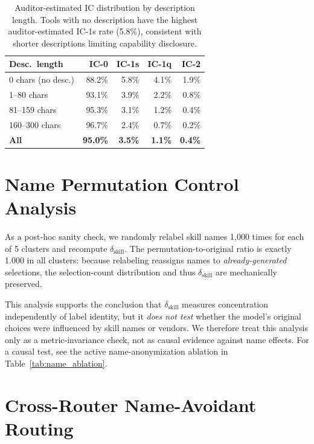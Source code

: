 \documentclass[11pt]{article}
\begin{document}
\begin{table}[t]
\centering\small
\begin{tabular}{lrrrr}
\toprule
\textbf{Desc.\ length} & \textbf{IC-0} & \textbf{IC-1s} & \textbf{IC-1q} & \textbf{IC-2} \\
\midrule
0 chars (no desc.)  & 88.2\% & 5.8\% & 4.1\% & 1.9\% \\
1--80 chars          & 93.1\% & 3.9\% & 2.2\% & 0.8\% \\
81--159 chars         & 95.3\% & 3.1\% & 1.2\% & 0.4\% \\
160--300 chars        & 96.7\% & 2.4\% & 0.7\% & 0.2\% \\
\midrule
\textbf{All}         & \textbf{95.0\%} & \textbf{3.5\%} & \textbf{1.1\%} & \textbf{0.4\%} \\
\bottomrule
\end{tabular}
\caption{Auditor-estimated IC distribution by description length.
Tools with no description have the highest auditor-estimated IC-1s
rate (5.8\%), consistent with shorter descriptions limiting
capability disclosure.}
\label{tab:ic_detailed}
\end{table}

\section{Name Permutation Control Analysis}
\label{app:namecontrol}

As a post-hoc sanity check, we randomly relabel skill names
1{,}000 times for each of 5 clusters and recompute
$\delta_\text{skill}$.
The permutation-to-original ratio is exactly 1.000 in all
clusters: because relabeling reassigns names to
\emph{already-generated} selections, the selection-count
distribution and thus $\delta_\text{skill}$ are mechanically
preserved.

This analysis supports the conclusion that $\delta_\text{skill}$ measures
concentration independently of label identity, but it
\emph{does not test} whether the model's original choices
were influenced by skill names or vendors.
We therefore treat this analysis only as a metric-invariance
check, not as causal evidence against name effects.
For a causal test, see the active name-anonymization
ablation in Table~\ref{tab:name_ablation}.

\section{Cross-Router Name-Avoidant Routing}
\label{app:cross_router}
\end{document}
